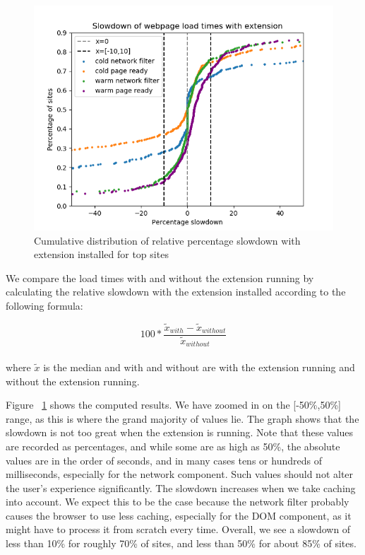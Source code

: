 \begin{figure}[h]
	\includegraphics[scale=0.5]{results/extension_slowdown_overall}
	\caption{Cumulative distribution of relative percentage slowdown with extension installed for top sites}
	\label{fig:overall_slowdown}
\end{figure}

We compare the load times with and without the extension running by calculating the relative slowdown with the extension installed according to the following formula: 

$$100*\frac{\tilde{x}_{with}-\tilde{x}_{without}}{\tilde{x}_{without}}$$
\\
where $\tilde{x}$ is the median and with and without are with the extension running and without the extension running.

Figure ~\ref{fig:overall_slowdown} shows the computed results. We have zoomed in on the [-50\%,50\%] range, as this is where the grand majority of values lie. The graph shows that the slowdown is not too great when the extension is running. Note that these values are recorded as percentages, and while some are as high as 50\%, the absolute values are in the order of seconds, and in many cases tens or hundreds of milliseconds, especially for the network component. Such values should not alter the user's experience significantly. The slowdown increases when we take caching into account. We expect this to be the case because the network filter probably causes the browser to use less caching, especially for the DOM component, as it might have to process it from scratch every time. Overall, we see a slowdown of less than 10\% for roughly 70\% of sites, and less than 50\% for about 85\% of sites.

